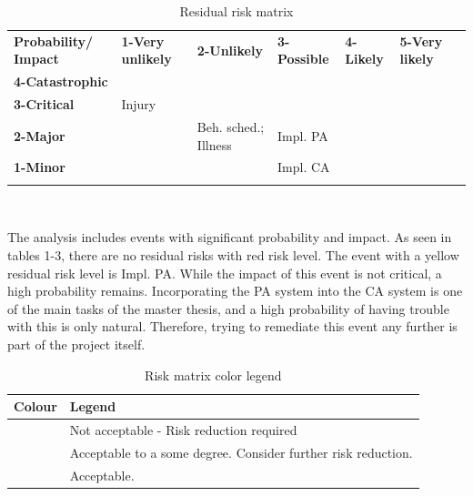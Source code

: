 \documentclass[informationsecurity]{gucmasterproject}
\begin{document}
\begin{table}[H]
\centering
\scriptsize
\begin{tabular}{|m{1.75cm}|m{1.75cm}|m{1.75cm}| m{1.75cm} |m{1.75cm}| m{1.75cm}|m{0cm}}
\hhline{|------|} \bf Probability/ Impact & \bf 1-Very unlikely & \bf 2-Unlikely & \bf 3-Possible & \bf 4-Likely & \bf 5-Very likely & \\[10pt]

\hhline{|------|} \bf 4-Catastrophic & \cellcolor{yellow!50} & \cellcolor{red!50} & \cellcolor{red!50} & \cellcolor{red!50} &\cellcolor{red!50} & \\ [10pt]

\hhline{|------|} \bf 3-Critical &\cellcolor{green!50} \centering Injury & \cellcolor{yellow!50} & \cellcolor{yellow!50} & \cellcolor{red!50} &\cellcolor{red!50} & \\ [10pt]

\hhline{|------|} \bf 2-Major & \cellcolor{green!50} & \cellcolor{green!50} \centering Beh. sched.; Illness & \cellcolor{yellow!50} \centering Impl. PA &\cellcolor{yellow!50} &\cellcolor{red!50} & \\[10pt]

\hhline{|------|} \bf 1-Minor & \cellcolor{green!50} & \cellcolor{green!50} & \cellcolor{green!50} \centering Impl. CA &\cellcolor{yellow!50} &\cellcolor{yellow!50} & \\ [10pt]
\hhline{|------|}
\end{tabular} \\
\caption{Residual risk matrix}
\label{tab:residual-risk}
\end{table}

The analysis includes events with significant probability and impact.
As seen in tables 1-3, there are no residual risks with red risk level.
The event with a yellow residual risk level is Impl. PA.
While the impact of this event is not critical, a high probability remains.
Incorporating the PA system into the CA system is one of the main tasks of the master thesis, and a high probability of having trouble with this is only natural.
Therefore, trying to remediate this event any further is part of the project itself.

\begin{table}[H]
\centering
\begin{tabular}{|p{2cm}|p{10cm}|}
\hline \bf Colour & \bf Legend \\
\hline \cellcolor{red! 50} & Not acceptable - Risk reduction required \\ [10pt]
\hline \cellcolor{yellow! 50} & Acceptable to a some degree. Consider further risk reduction. \\[10pt]
\hline \cellcolor{green! 50} & Acceptable. \\ [10pt]
\hline
\end{tabular}
\caption{Risk matrix color legend}
\label{tab:colour-legend}
\end{table}
\end{document}
